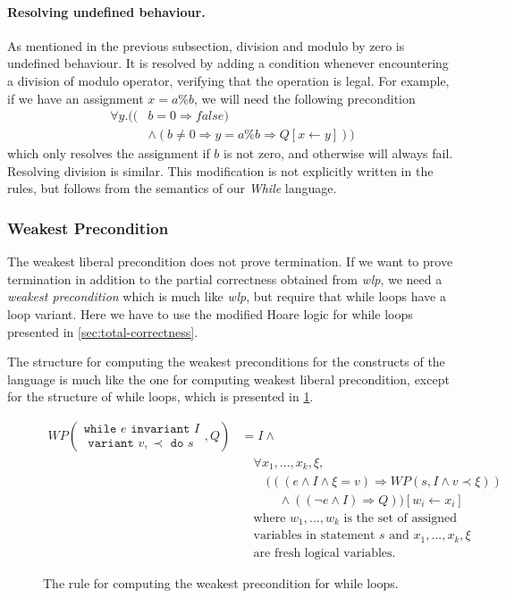 \paragraph{Resolving undefined behaviour.}
As mentioned in the previous subsection, division and modulo by zero is undefined behaviour.
It is resolved by adding a condition whenever encountering a division of modulo operator, verifying that the operation is legal.
For example, if we have an assignment $x = a \% b$, we will need the following precondition
\begin{align*}
	\forall y . ( (&b = 0 \Rightarrow false) \\
                 &\land (b \neq 0 \Rightarrow y = a \% b \Rightarrow Q[x \leftarrow y]))
\end{align*} 
which only resolves the assignment if $b$ is not zero, and otherwise will always fail. Resolving division is similar.
This modification is not explicitly written in the rules, but follows from the semantics of our \textit{While} language.

\subsubsection{Weakest Precondition}
The weakest liberal precondition does not prove termination. If we want to prove termination in addition to the partial correctness obtained from \textit{wlp}, we need a \textit{weakest precondition} which is much like \textit{wlp}, but require that while loops have a loop variant. 
Here we have to use the modified Hoare logic for while loops presented in \cref{sec:total-correctness}.

The structure for computing the weakest preconditions for the constructs of the language is much like the one for computing weakest liberal precondition, except for the structure of while loops, which is presented in \cref{fig:wp}.

\begin{figure}[h!]
\begin{align*}
	WP\left(
     \begin{array}{c}
     \texttt{while } e \texttt{ invariant } I \\
     \texttt{ variant } v, \prec \texttt{ do } s
     \end{array}
    , Q \right) 
    &= 
		I \land \label{eq:wpwhile} \\
    &\quad \forall x_1, ..., x_k, \xi, \\
    &\quad \quad (((e \land I \land \xi = v) \Rightarrow WP(s, I \land v \prec \xi)) \\
    &\quad \quad \quad \land ((\neg e \land I) \Rightarrow Q)) [w_i \leftarrow x_i] \\
	&\quad \text{where } w_1, ..., w_k \text{ is the set of assigned} \\
	&\quad \text{variables in statement } s \text{ and } x_1, ..., x_k, \xi \\
	&\quad \text{are fresh logical variables.}
\end{align*}
\caption{The rule for computing the weakest precondition for while loops.}
\label{fig:wp}
\end{figure}

